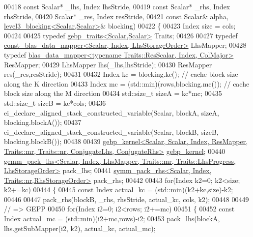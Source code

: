 \begin{DoxyCode}
00418     \textcolor{keyword}{const} Scalar* \_lhs, Index lhsStride,
00419     \textcolor{keyword}{const} Scalar* \_rhs, Index rhsStride,
00420     Scalar* \_res,        Index resStride,
00421     \textcolor{keyword}{const} Scalar& alpha, \hyperlink{class_eigen_1_1internal_1_1level3__blocking}{level3\_blocking<Scalar,Scalar>}& blocking)
00422   \{
00423     Index size = cols;
00424 
00425     \textcolor{keyword}{typedef} \hyperlink{class_eigen_1_1internal_1_1gebp__traits}{gebp\_traits<Scalar,Scalar>} Traits;
00426 
00427     \textcolor{keyword}{typedef} \hyperlink{class_eigen_1_1internal_1_1const__blas__data__mapper}{const\_blas\_data\_mapper<Scalar, Index, LhsStorageOrder>}
       LhsMapper;
00428     \textcolor{keyword}{typedef} \hyperlink{class_eigen_1_1internal_1_1blas__data__mapper}{blas\_data\_mapper<typename Traits::ResScalar, Index, ColMajor>}
       ResMapper;
00429     LhsMapper lhs(\_lhs,lhsStride);
00430     ResMapper res(\_res,resStride);
00431 
00432     Index kc = blocking.kc();                   \textcolor{comment}{// cache block size along the K direction}
00433     Index mc = (std::min)(rows,blocking.mc());  \textcolor{comment}{// cache block size along the M direction}
00434     std::size\_t sizeA = kc*mc;
00435     std::size\_t sizeB = kc*cols;
00436     ei\_declare\_aligned\_stack\_constructed\_variable(Scalar, blockA, sizeA, blocking.blockA());
00437     ei\_declare\_aligned\_stack\_constructed\_variable(Scalar, blockB, sizeB, blocking.blockB());
00438 
00439     
      \hyperlink{struct_eigen_1_1internal_1_1gebp__kernel}{gebp\_kernel<Scalar, Scalar, Index, ResMapper, Traits::mr, Traits::nr, ConjugateLhs, ConjugateRhs>}
       \hyperlink{struct_eigen_1_1internal_1_1gebp__kernel}{gebp\_kernel};
00440     
      \hyperlink{struct_eigen_1_1internal_1_1gemm__pack__lhs}{gemm\_pack\_lhs<Scalar, Index, LhsMapper, Traits::mr, Traits::LhsProgress, LhsStorageOrder>}
       pack\_lhs;
00441     \hyperlink{struct_eigen_1_1internal_1_1symm__pack__rhs}{symm\_pack\_rhs<Scalar, Index, Traits::nr,RhsStorageOrder>}
       pack\_rhs;
00442 
00443     \textcolor{keywordflow}{for}(Index k2=0; k2<size; k2+=kc)
00444     \{
00445       \textcolor{keyword}{const} Index actual\_kc = (std::min)(k2+kc,size)-k2;
00446 
00447       pack\_rhs(blockB, \_rhs, rhsStride, actual\_kc, cols, k2);
00448 
00449       \textcolor{comment}{// => GEPP}
00450       \textcolor{keywordflow}{for}(Index i2=0; i2<rows; i2+=mc)
00451       \{
00452         \textcolor{keyword}{const} Index actual\_mc = (std::min)(i2+mc,rows)-i2;
00453         pack\_lhs(blockA, lhs.getSubMapper(i2, k2), actual\_kc, actual\_mc);

\end{DoxyCode}
